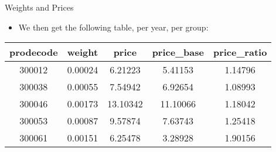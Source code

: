 \documentclass{beamer}
\begin{document}
\begin{frame}{Weights and Prices}
    \begin{itemize}
        \item We then get the following table, per year, per group:
    \end{itemize}
    \begin{tabular}{c c c c c}
        \hline
        \textbf{prodecode} & \textbf{weight} & \textbf{price} & \textbf{price\_base} & \textbf{price\_ratio} \\
        \hline
        300012             & 0.00024         & 6.21223        & 5.41153              & 1.14796               \\
        \hline
        300038             & 0.00055         & 7.54942        & 6.92654              & 1.08993               \\
        \hline
        300046             & 0.00173         & 13.10342       & 11.10066             & 1.18042               \\
        \hline
        300053             & 0.00087         & 9.57874        & 7.63743              & 1.25418               \\
        \hline
        300061             & 0.00151         & 6.25478        & 3.28928              & 1.90156               \\
        \hline
    \end{tabular}
\end{frame}
\end{document}

